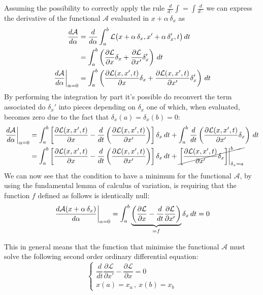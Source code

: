 	Assuming the possibility to correctly apply the rule $\frac{d}{d\cdot} \int = \int \frac{d}{d\cdot}$ we can express the derivative of the functional $\mathcal A$ evaluated in $x+ \alpha\, \delta_x$ as
	\begin{align*}
		\frac{d\mathcal A}{d\alpha} & = \frac{d}{d\alpha} \int_a^b \mathcal L\big( x + \alpha\, \delta_x ,x' + \alpha\, \delta_x', t\big)\, dt \\
		& = \int_a^b \left(\frac{\partial \mathcal L}{\partial x} \delta_x + \frac{\partial \mathcal L}{\partial x'} \delta_x'\right)\, dt \\
		\left. \frac{d\mathcal A}{d\alpha} \right|_{\alpha = 0} & = \int_a^b \left( \frac{\partial \mathcal L(x,x',t)}{\partial x} \delta_x + \frac{\partial \mathcal L(x,x',t)}{\partial x'} \delta_x' \right)\, dt 
	\end{align*}
	By performing the integration by part it's possible do reconvert the term associated do $\delta_x'$ into pieces depending on $\delta_x$ one of which, when evaluated, becomes zero due to the fact that $\delta_x(a) = \delta_x(b) = 0$:
	\begin{align*}
		\left. \frac{d\mathcal A}{d\alpha} \right|_{\alpha = 0} & = \int_a^b \left[ \frac{\partial \mathcal L(x,x',t)}{\partial x} - \frac{d}{dt} \left( \frac{\partial \mathcal L(x,x',t)}{\partial x'} \right) \right] \delta_x\, dt + \int_a^b\frac{d}{dt}\left( \frac{\partial \mathcal L(x,x',t)}{\partial x'}\delta_x \right) \, dt \\
		& = \int_a^b \left[ \frac{\partial \mathcal L(x,x',t)}{\partial x} - \frac{d}{dt} \left( \frac{\partial \mathcal L(x,x',t)}{\partial x'} \right) \right] \delta_x\, dt + \cancel{\left. \left[ \frac{\partial \mathcal L(x,x',t)}{\partial x'}\delta_x \right] \right|_{\delta_x = a}^b} \\
	\end{align*}
	We can now see that the condition to have a minimum for the functional $\mathcal A$, by using the fundamental lemma of calculus of variation, is requiring that the function $f$ defined as follows is identically null:
	\begin{equation} \label{eq:func:var1}
		\left. \frac{d\mathcal A(x+\alpha\, \delta_x)}{d\alpha} \right|_{\alpha = 0} = \int_a^b \underbrace{\left(\frac{\partial \mathcal L}{\partial x} - \frac d{dt}\frac{\partial \mathcal L}{\partial x'}\right)}_{=f} \delta_x \, dt = 0
	\end{equation}
	
	This in general means that the function that minimise the functional $\mathcal A$ must solve the following second order ordinary differential equation:
	\[ \begin{cases}
		\dfrac d{dt} \dfrac{\partial\mathcal L}{\partial x'} - \dfrac {\partial \mathcal L}{\partial x} = 0 \\ x(a) = x_a \, ,\ x(b) = x_b
	\end{cases} \]
	
